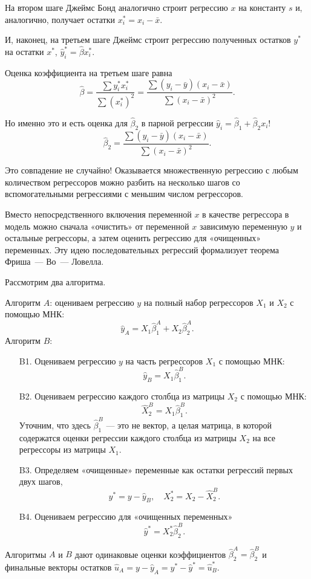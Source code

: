 \documentclass[12pt]{article}
\newcommand{\hb}{\hat{\beta}}
\newcommand{\hu}{\hat{u}}
\newcommand{\hy}{\hat{y}}
\newcommand{\one}{s} %
\begin{document}
На втором шаге Джеймс Бонд аналогично строит регрессию $x$ на константу $\one$ и, аналогично, получает остатки $x^*_i = x_i - \bar x$.

И, наконец, на третьем шаге Джеймс строит регрессию полученных остатков $y^*$ на остатки $x^*$,
$\hat y^*_i = \hb x^*_i$.

Оценка коэффициента на третьем шаге равна
\[
\hb = \frac{\sum y_i^* x_i^*}{\sum(x_i^*)^2} = \frac{\sum (y_i - \bar y)(x_i - \bar x)}{\sum (x_i - \bar x)^2}.
\]

Но именно это и есть оценка для $\hb_2$ в парной регрессии $\hy_i = \hb_1 + \hb_2 x_i$!
\[
\hb_2 = \frac{\sum (y_i - \bar y)(x_i - \bar x)}{\sum (x_i - \bar x)^2}.
\]

Это совпадение не случайно! 
Оказывается множественную регрессию с любым количеством регрессоров можно разбить на несколько шагов со вспомогательными регрессиями с меньшим числом регрессоров. 

Вместо непосредственного включения переменной $x$ в качестве регрессора в модель можно сначала «очистить» от переменной $x$ зависимую переменную $y$ и остальные регрессоры,
а затем оценить регрессию для «очищенных» переменных.
Эту идею последовательных регрессий формализует теорема Фриша~— Во~— Ловелла.


\begin{theorem}

Рассмотрим два алгоритма. 

Алгоритм $A$: оцениваем регрессию $y$ на полный набор регрессоров $X_1$ и $X_2$ с помощью МНК:
\[
\hy_A = X_1 \hb_1^A  + X_2 \hb_2^A.
\]
Алгоритм $B$: 
\begin{enumerate}
    \item[B1.] Оцениваем регрессию $y$ на часть регрессоров $X_1$ с помощью МНК:
    \[
    \hy_{B} = X_1 \hb_1^{B}.
    \]
    \item[B2.] Оцениваем регрессию каждого столбца из матрицы $X_2$ с помощью МНК:
    \[
    \hat X_2^{B} = X_1 \hb_1^{B}.
    \]
    Уточним, что здесь $\hb_1^B$ — это не вектор, а целая матрица, в которой содержатся оценки регрессии каждого столбца из матрицы $X_2$ на все регрессоры из матрицы $X_1$.
    \item[B3.] Определяем «очищенные» переменные как остатки регрессий первых двух шагов,
    \[
    y^* = y - \hy_B, \quad X_2^* = X_2 - \hat X_2^B.
    \]
    \item[B4.] Оцениваем регрессию для «очищенных переменных»
    \[
    \hy^* = X_2^*\hb_2^B.
    \]
\end{enumerate}

Алгоритмы $A$ и $B$ дают одинаковые оценки коэффициентов $\hb_2^A = \hb_2^B$ и финальные векторы остатков $\hu_A = y - \hy_A = y^* - \hy^* = \hu^*_B$.
\end{theorem}
\end{document}
